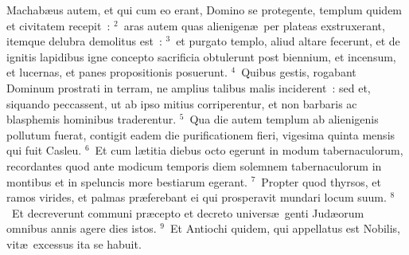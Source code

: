 \bchapter
\lettrine[lines=3,image=true,loversize=0.05,lraise=-0.03]{M}{}achab\ae us autem, et qui cum eo erant, Domino se protegente, templum quidem et civitatem recepit~:
${}^{2}$~aras autem quas alienigen\ae\ per plateas exstruxerant, itemque delubra demolitus est~:
${}^{3}$~et purgato templo, aliud altare fecerunt, et de ignitis lapidibus igne concepto sacrificia obtulerunt post biennium, et incensum, et lucernas, et panes propositionis posuerunt.
${}^{4}$~Quibus gestis, rogabant Dominum prostrati in terram, ne amplius talibus malis inciderent~: sed et, siquando peccassent, ut ab ipso mitius corriperentur, et non barbaris ac blasphemis hominibus traderentur.
${}^{5}$~Qua die autem templum ab alienigenis pollutum fuerat, contigit eadem die purificationem fieri, vigesima quinta mensis qui fuit Casleu.
${}^{6}$~Et cum l\ae titia diebus octo egerunt in modum tabernaculorum, recordantes quod ante modicum temporis diem solemnem tabernaculorum in montibus et in speluncis more bestiarum egerant.
${}^{7}$~Propter quod thyrsos, et ramos virides, et palmas pr\ae ferebant ei qui prosperavit mundari locum suum.
${}^{8}$~Et decreverunt communi pr\ae cepto et decreto univers\ae\ genti Jud\ae orum omnibus annis agere dies istos.
${}^{9}$~Et Antiochi quidem, qui appellatus est Nobilis, vit\ae\ excessus ita se habuit.


